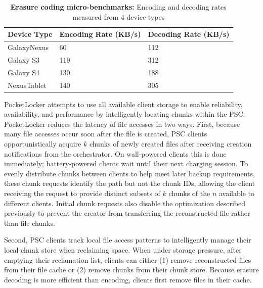 \begin{table}[t]
{\small

\begin{tabularx}{\columnwidth}{XXX}

\textbf{Device Type} & \textbf{Encoding Rate (KB/s)} & \textbf{Decoding Rate (KB/s)}
\\ \toprule
GalaxyNexus & 60 & 112  \\
Galaxy S3 & 119 & 312  \\
Galaxy S4 & 130 & 188  \\
NexusTablet & 140 & 305  \\

\end{tabularx}
}

\caption{\small \textbf{Erasure coding micro-benchmarks:}
Encoding and decoding rates measured from 4 device types}

\label{tab:coding-perf}
  \vspace*{-0.2in}

\end{table}


PocketLocker attempts to use all available client storage to enable
reliability, availability, and performance by intelligently locating chunks
within the PSC. PocketLocker reduces the latency of file accesses in two
ways. First, because many file accesses occur soon after the file is created,
PSC clients opportunistically acquire $k$ chunks of newly created files after
receiving creation notifications from the orchestrator. On wall-powered
clients this is done immediately; battery-powered clients wait until their
next charging session. To evenly distribute chunks between clients to help
meet later backup requirements, these chunk requests identify the path but
not the chunk IDs, allowing the client receiving the request to provide
distinct subsets of $k$ chunks of the $n$ available to different clients.
Initial chunk requests also disable the optimization described previously to
prevent the creator from transferring the reconstructed file rather than file
chunks.

Second, PSC clients track local file access patterns to intelligently manage
their local chunk store when reclaiming space. When under storage pressure,
after emptying their reclamation list, clients can either (1) remove
reconstructed files from their file cache or (2) remove chunks from their
chunk store. Because erasure decoding is more efficient than encoding,
clients first remove files in their cache.

